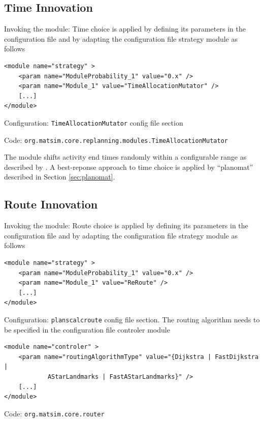 \subsection{Time Innovation}
\label{sec:timechoice}
\begin{compactitem}
\item Invoking the module: Time choice is applied by defining its parameters in the configuration file and by adapting the configuration file strategy module as follows
%
\begin{lstlisting}
<module name="strategy" >
    <param name="ModuleProbability_1" value="0.x" />
    <param name="Module_1" value="TimeAllocationMutator" />
    [...]
</module>
\end{lstlisting}
%
\item Configuration: \lstinline|TimeAllocationMutator| config file section
\item Code: \lstinline|org.matsim.core.replanning.modules.TimeAllocationMutator|
\end{compactitem}

The module shifts activity end times randomly within a configurable range as described by \citet[][]{BalmerEtAl_Timmermans_2005, Raney_PhDThesis_2005, Balmer_unpub_VSP_2004, BalmerEtAl_unpub_EIRASS_2004, BalmerEtAl_unpub_STRC_2004}. A best-reponse approach to time choice is applied by ``planomat'' described in Section \ref{sec:planomat}.

\subsection{Route Innovation}
\label{sec:routechoice}
\begin{compactitem}
\item Invoking the module: Route choice is applied by defining its parameters in the configuration file and by adapting the configuration file strategy module as follows
%
\begin{lstlisting}
<module name="strategy" >
    <param name="ModuleProbability_1" value="0.x" />
    <param name="Module_1" value="ReRoute" />
    [...]
</module>
\end{lstlisting}
%
\item Configuration: \lstinline|planscalcroute| config file section. The routing algorithm needs to be specified in the configuration file controler module
%
\begin{lstlisting}
<module name="controler" >
    <param name="routingAlgorithmType" value="{Dijkstra | FastDijkstra |
    		AStarLandmarks | FastAStarLandmarks}" />
    [...]
</module>
\end{lstlisting}
\item Code: \lstinline|org.matsim.core.router|
\end{compactitem}

